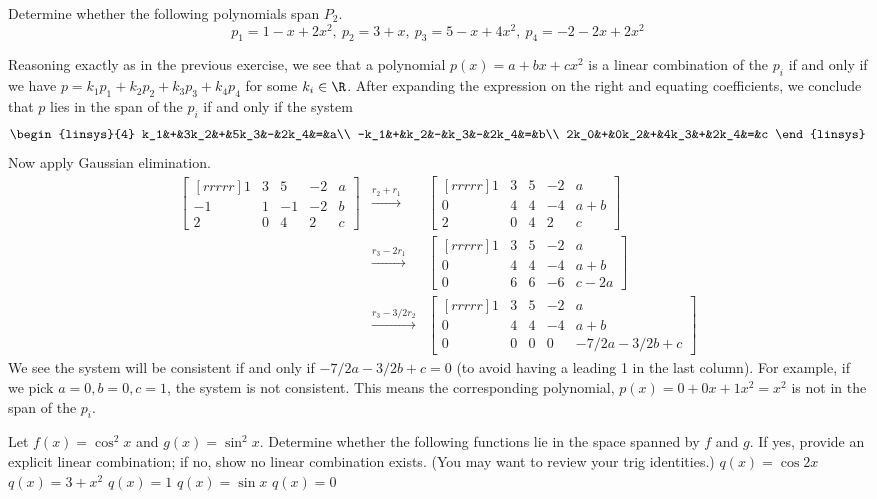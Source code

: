 \ii Determine whether the following polynomials span $P_2$.
$$
p_1= 1-x+2x^2, \ p_2=3+x, \ p_3 = 5 -x +4x^2,\  p_4 = -2-2x+2x^2
$$
\begin{solution} Reasoning exactly as in the previous exercise, we see that a polynomial $p(x)=a+bx+cx^2$ is a linear combination of the $p_i$ if and only if we have $p=k_1p_1+k_2p_2+k_3p_3+k_4p_4$ for some $k_i\in\R$. After expanding the expression on the right and equating coefficients, we conclude that $p$  lies in the span of the $p_i$ if and only if the system 
\[
\begin{linsys}{4}
k_1&+&3k_2&+&5k_3&-&2k_4&=&a\\
-k_1&+&k_2&-&k_3&-&2k_4&=&b\\
2k_0&+&0k_2&+&4k_3&+&2k_4&=&c
\end{linsys}
\]
Now apply Gaussian elimination. 
\begin{eqnarray*}
\begin{bmatrix}[rrrrr]
1&3&5&-2&a\\
-1&1&-1&-2&b\\
2&0&4&2&c
\end{bmatrix}
&\xrightarrow[]{r_2+r_1}&
\begin{bmatrix}[rrrrr]
1&3&5&-2&a\\
0&4&4&-4&a+b\\
2&0&4&2&c
\end{bmatrix}\\
&\xrightarrow[]{r_3-2r_1}&
\begin{bmatrix}[rrrrr]
1&3&5&-2&a\\
0&4&4&-4&a+b\\
0&6&6&-6&c-2a
\end{bmatrix}\\
&\xrightarrow[]{r_3-3/2r_2}&
\begin{bmatrix}[rrrrr]
1&3&5&-2&a\\
0&4&4&-4&a+b\\
0&0&0&0&-7/2a-3/2b+c
\end{bmatrix}
\end{eqnarray*}
We see the system will be consistent if and only if $-7/2a-3/2b+c=0$ (to avoid having a leading 1 in the last column). For example, if we pick $a=0, b=0, c=1$, the system is not consistent. This means the corresponding polynomial, $p(x)=0+0x+1x^2=x^2$ is not in the span of the $p_i$. 
\end{solution}
\ii Let $f(x)= \cos^2x$ and $g(x)= \sin^2x$. Determine whether the following functions lie in the space spanned by $f$ and $g$. If yes, provide an explicit linear combination; if no, show no linear combination exists. (You may want to review your trig identities.) 
\bb
\ii $q(x)=\cos 2x$
\ii $q(x)=3+x^2$
\ii $q(x)=1$
\ii $q(x)=\sin x$
\ii $q(x)=0$
\ee

